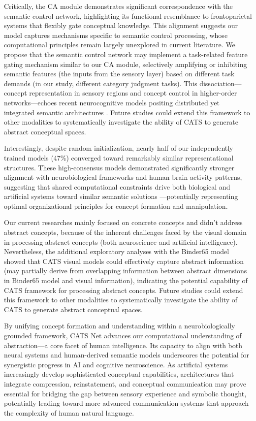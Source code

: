 \documentclass[pdflatex,sn-mathphys-num,lineno]{sn-jnl}%
\begin{document}
\begin{CJK}{UTF8}{gbsn}
Critically, the CA module demonstrates significant correspondence with the semantic control network, highlighting its functional resemblance to frontoparietal systems that flexibly gate conceptual knowledge. This alignment suggests our model captures mechanisms specific to semantic control processing, whose computational principles remain largely unexplored in current literature. We propose that the semantic control network may implement a task-related feature gating mechanism similar to our CA module, selectively amplifying or inhibiting semantic features (the inputs from the sensory layer) based on different task demands (in our study, different category judgment tasks). This dissociation—concept representation in sensory regions and concept control in higher-order networks—echoes recent neurocognitive models positing distributed yet integrated semantic architectures \cite{ralph_neural_2017}. Future studies could extend this framework to other modalities to systematically investigate the ability of CATS to generate abstract conceptual spaces.

Interestingly, despite random initialization, nearly half of our independently trained models (47\%) converged toward remarkably similar representational structures. These high-consensus models demonstrated significantly stronger alignment with neurobiological frameworks and human brain activity patterns, suggesting that shared computational constraints drive both biological and artificial systems toward similar semantic solutions \cite{carandini_normalization_2012}—potentially representing optimal organizational principles for concept formation and manipulation.

Our current researches mainly focused on concrete concepts and didn’t address abstract concepts, because of the inherent challenges faced by the visual domain in processing abstract concepts (both neuroscience and artificial intelligence). Nevertheless, the additional exploratory analyses with the Binder65 model showed that CATS visual models could effectively capture abstract information (may partially derive from overlapping information between abstract dimensions in Binder65 model and visual information), indicating the potential capability of CATS framework for processing abstract concepts. Future studies could extend this framework to other modalities to systematically investigate the ability of CATS to generate abstract conceptual spaces.

By unifying concept formation and understanding within a neurobiologically grounded framework, CATS Net advances our computational understanding of abstraction—a core facet of human intelligence. Its capacity to align with both neural systems and human-derived semantic models underscores the potential for synergistic progress in AI and cognitive neuroscience. As artificial systems increasingly develop sophisticated conceptual capabilities, architectures that integrate compression, reinstatement, and conceptual communication may prove essential for bridging the gap between sensory experience and symbolic thought, potentially leading toward more advanced communication systems that approach the complexity of human natural language.



\end{CJK}
\end{document}
